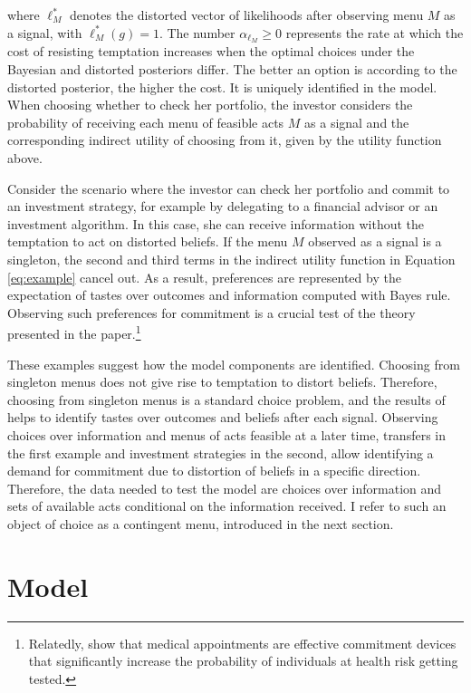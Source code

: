 where \( \ell^{*}_M \) denotes the distorted vector of likelihoods after observing menu \( M \) as a signal, with \( \ell^{*}_M \left( g \right) = 1 \). The number \( \alpha_{\ell_M} \geq 0 \) represents the rate at which the cost of resisting temptation increases when the optimal choices under the Bayesian and distorted posteriors differ. The better an option is according to the distorted posterior, the higher the cost. It is uniquely identified in the model. When choosing whether to check her portfolio, the investor considers the probability of receiving each menu of feasible acts \( M \) as a signal and the corresponding indirect utility of choosing from it, given by the utility function above.

Consider the scenario where the investor can check her portfolio and commit to an investment strategy, for example by delegating to a financial advisor or an investment algorithm. In this case, she can receive information without the temptation to act on distorted beliefs. If the menu \( M \) observed as a signal is a singleton, the second and third terms in the indirect utility function in Equation \eqref{eq:example} cancel out. As a result, preferences are represented by the expectation of tastes over outcomes and information computed with Bayes rule. Observing such preferences for commitment is a crucial test of the theory presented in the paper.\footnote{Relatedly, \cite{derksenHealthcareAppointmentsCommitment2024} show that medical appointments are effective commitment devices that significantly increase the probability of individuals at health risk getting tested.}

These examples suggest how the model components are identified. Choosing from singleton menus does not give rise to temptation to distort beliefs. Therefore, choosing from singleton menus is a standard choice problem, and the results of \cite{anscombeDefinitionSubjectiveProbability1963} helps to identify tastes over outcomes and beliefs after each signal. Observing choices over information and menus of acts feasible at a later time, transfers in the first example and investment strategies in the second, allow identifying a demand for commitment due to distortion of beliefs in a specific direction. Therefore, the data needed to test the model are choices over information and sets of available acts conditional on the information received. I refer to such an object of choice as a contingent menu, introduced in the next section.

\section{Model}\label{sec:model}

